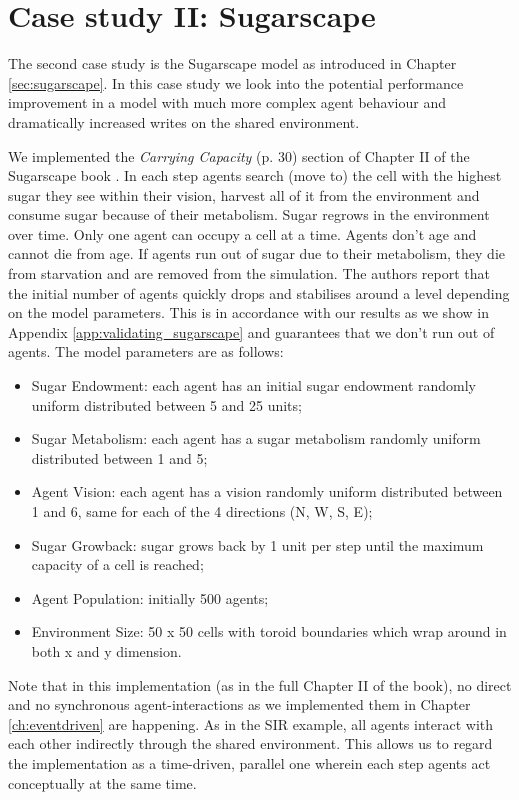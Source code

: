 \section{Case study II: Sugarscape}
\label{sec:sugarscape_concurrent}
The second case study is the Sugarscape model as introduced in Chapter \ref{sec:sugarscape}. In this case study we look into the potential performance improvement in a model with much more complex agent behaviour and dramatically increased writes on the shared environment.

We implemented the \textit{Carrying Capacity} (p. 30) section of Chapter II of the Sugarscape book \cite{epstein_growing_1996}. In each step agents search (move to) the cell with the highest sugar they see within their vision, harvest all of it from the environment and consume sugar because of their metabolism. Sugar regrows in the environment over time. Only one agent can occupy a cell at a time. Agents don't age and cannot die from age. If agents run out of sugar due to their metabolism, they die from starvation and are removed from the simulation. The authors report that the initial number of agents quickly drops and stabilises around a level depending on the model parameters. This is in accordance with our results as we show in Appendix \ref{app:validating_sugarscape} and guarantees that we don't run out of agents. The model parameters are as follows:

\begin{itemize}
	\item Sugar Endowment: each agent has an initial sugar endowment randomly uniform distributed between 5 and 25 units;
	\item Sugar Metabolism: each agent has a sugar metabolism randomly uniform distributed between 1 and 5;
	\item Agent Vision: each agent has a vision randomly uniform distributed between 1 and 6, same for each of the 4 directions (N, W, S, E);
	\item Sugar Growback: sugar grows back by 1 unit per step until the maximum capacity of a cell is reached;
	\item Agent Population: initially 500 agents;
	\item Environment Size: 50 x 50 cells with toroid boundaries which wrap around in both x and y dimension.
\end{itemize}

Note that in this implementation (as in the full Chapter II of the book), no direct and no synchronous agent-interactions as we implemented them in Chapter \ref{ch:eventdriven} are happening. As in the SIR example, all agents interact with each other indirectly through the shared environment. This allows us to regard the implementation as a time-driven, parallel one wherein each step agents act conceptually at the same time.

